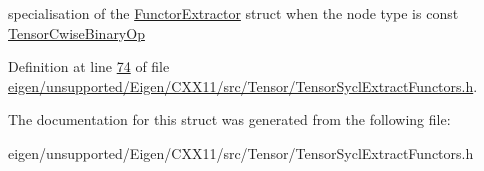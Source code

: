 specialisation of the \hyperlink{struct_eigen_1_1_tensor_sycl_1_1internal_1_1_functor_extractor}{Functor\+Extractor} struct when the node type is const \hyperlink{class_eigen_1_1_tensor_cwise_binary_op}{Tensor\+Cwise\+Binary\+Op} 

Definition at line \hyperlink{eigen_2unsupported_2_eigen_2_c_x_x11_2src_2_tensor_2_tensor_sycl_extract_functors_8h_source_l00074}{74} of file \hyperlink{eigen_2unsupported_2_eigen_2_c_x_x11_2src_2_tensor_2_tensor_sycl_extract_functors_8h_source}{eigen/unsupported/\+Eigen/\+C\+X\+X11/src/\+Tensor/\+Tensor\+Sycl\+Extract\+Functors.\+h}.



The documentation for this struct was generated from the following file\+:\begin{DoxyCompactItemize}
\item 
eigen/unsupported/\+Eigen/\+C\+X\+X11/src/\+Tensor/\+Tensor\+Sycl\+Extract\+Functors.\+h\end{DoxyCompactItemize}
